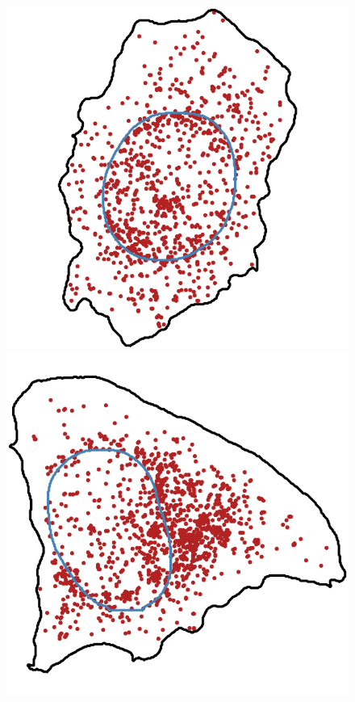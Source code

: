 \begin{figure}[h]
	\endminipage\hfill
		\includegraphics[width=\linewidth]{figures/introduction/real_coord_nuclear_edge}
	\endminipage\hfill
		\includegraphics[width=\linewidth]{figures/introduction/real_coord_perinuclear}

\end{figure}
